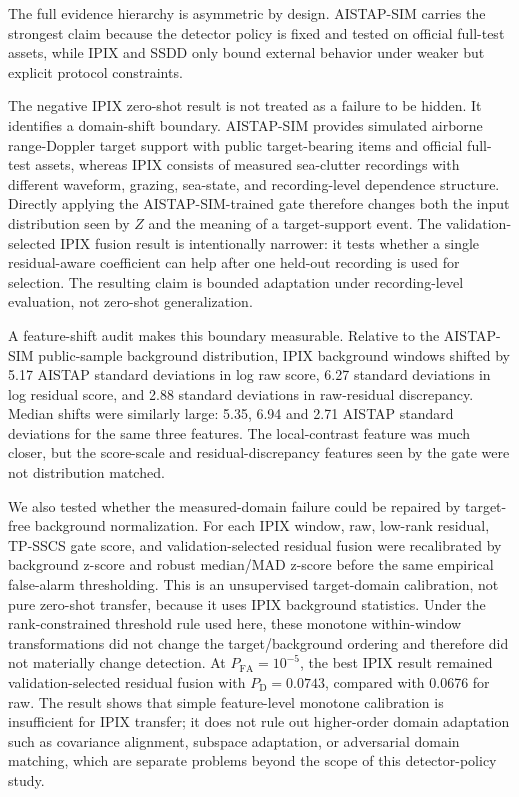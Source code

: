 \documentclass[journal]{IEEEtran}
\begin{document}
The full evidence hierarchy is asymmetric by design. AISTAP-SIM carries the strongest claim because the detector policy is fixed and tested on official full-test assets, while IPIX and SSDD only bound external behavior under weaker but explicit protocol constraints.

The negative IPIX zero-shot result is not treated as a failure to be hidden. It identifies a domain-shift boundary. AISTAP-SIM provides simulated airborne range-Doppler target support with public target-bearing items and official full-test assets, whereas IPIX consists of measured sea-clutter recordings with different waveform, grazing, sea-state, and recording-level dependence structure. Directly applying the AISTAP-SIM-trained gate therefore changes both the input distribution seen by $Z$ and the meaning of a target-support event. The validation-selected IPIX fusion result is intentionally narrower: it tests whether a single residual-aware coefficient can help after one held-out recording is used for selection. The resulting claim is bounded adaptation under recording-level evaluation, not zero-shot generalization.

A feature-shift audit makes this boundary measurable. Relative to the AISTAP-SIM public-sample background distribution, IPIX background windows shifted by 5.17 AISTAP standard deviations in log raw score, 6.27 standard deviations in log residual score, and 2.88 standard deviations in raw-residual discrepancy. Median shifts were similarly large: 5.35, 6.94 and 2.71 AISTAP standard deviations for the same three features. The local-contrast feature was much closer, but the score-scale and residual-discrepancy features seen by the gate were not distribution matched.

We also tested whether the measured-domain failure could be repaired by target-free background normalization. For each IPIX window, raw, low-rank residual, TP-SSCS gate score, and validation-selected residual fusion were recalibrated by background z-score and robust median/MAD z-score before the same empirical false-alarm thresholding. This is an unsupervised target-domain calibration, not pure zero-shot transfer, because it uses IPIX background statistics. Under the rank-constrained threshold rule used here, these monotone within-window transformations did not change the target/background ordering and therefore did not materially change detection. At $P_{\mathrm{FA}}=10^{-5}$, the best IPIX result remained validation-selected residual fusion with $P_{\mathrm{D}}=0.0743$, compared with 0.0676 for raw. The result shows that simple feature-level monotone calibration is insufficient for IPIX transfer; it does not rule out higher-order domain adaptation such as covariance alignment, subspace adaptation, or adversarial domain matching, which are separate problems beyond the scope of this detector-policy study.
\end{document}
